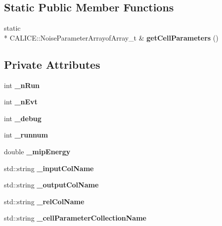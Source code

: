 \subsection*{Static Public Member Functions}
\begin{DoxyCompactItemize}
\item 
static \\*
C\-A\-L\-I\-C\-E\-::\-Noise\-Parameter\-Arrayof\-Array\-\_\-t \& {\bfseries get\-Cell\-Parameters} ()\label{classCALICE_1_1TBEcalDigitisation_a5f357fd6556cc967c61e06e1799fd6c5}

\end{DoxyCompactItemize}
\subsection*{Private Attributes}
\begin{DoxyCompactItemize}
\item 
int {\bfseries \-\_\-n\-Run}\label{classCALICE_1_1TBEcalDigitisation_a8b0bf0725d87671080456d9abde15141}

\item 
int {\bfseries \-\_\-n\-Evt}\label{classCALICE_1_1TBEcalDigitisation_a09bea609608d0ec3f176e7919cb0fde2}

\item 
int {\bfseries \-\_\-debug}\label{classCALICE_1_1TBEcalDigitisation_a4d92596c66587a5c28c64ceaa0bf0c30}

\item 
int {\bfseries \-\_\-runnum}\label{classCALICE_1_1TBEcalDigitisation_a7583207c7420d2ad34254e37ea56e339}

\item 
double {\bfseries \-\_\-mip\-Energy}\label{classCALICE_1_1TBEcalDigitisation_abbe56f4bd66b7a36c0433be7c964fa31}

\item 
std\-::string {\bfseries \-\_\-input\-Col\-Name}\label{classCALICE_1_1TBEcalDigitisation_a9e21c767054e4aac049af0948b3655f0}

\item 
std\-::string {\bfseries \-\_\-output\-Col\-Name}\label{classCALICE_1_1TBEcalDigitisation_a964d7cb09e8e7e942be3e0dc3b8aa89d}

\item 
std\-::string {\bfseries \-\_\-rel\-Col\-Name}\label{classCALICE_1_1TBEcalDigitisation_a8a65575b6105516c40796f2321aad0ed}

\item 
std\-::string {\bfseries \-\_\-cell\-Parameter\-Collection\-Name}\label{classCALICE_1_1TBEcalDigitisation_a731d48a25e95f126c24a8b017b34ee7d}


\end{DoxyCompactItemize}
